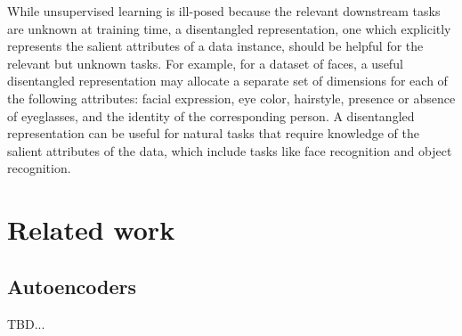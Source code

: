 \documentclass[11pt,a4paper]{article}
\begin{document}
While unsupervised learning is ill-posed because the relevant downstream tasks are unknown at training time, a disentangled representation, one which explicitly represents the salient attributes of a data instance, should be helpful for the relevant but unknown tasks. For example, for a dataset of faces, a useful disentangled representation may allocate a separate set of dimensions for each of the following attributes: facial expression, eye color, hairstyle, presence or absence of eyeglasses, and the identity of the corresponding person. A disentangled representation can be useful for natural tasks that require knowledge of the salient attributes of the data, which include tasks like face recognition and object recognition.

\section{Related work}


\subsection{Autoencoders}
TBD...
\end{document}
